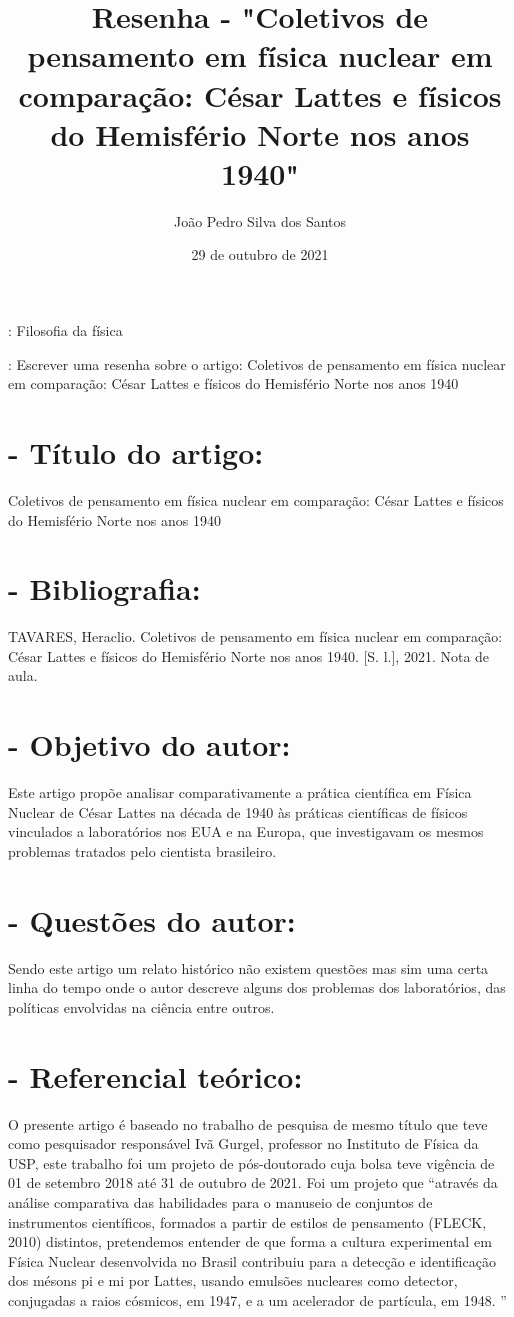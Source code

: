 \documentclass [a4paper, 12pt]{article}
\title{Resenha - "Coletivos de pensamento em física nuclear em comparação: César Lattes e físicos do Hemisfério Norte nos anos 1940"}
\author{João Pedro Silva dos Santos}
\date{29 de outubro de 2021}
\begin{document}
\maketitle

{}: Filosofia da física

{}: Escrever uma resenha sobre o artigo: Coletivos de pensamento em física nuclear em comparação: César Lattes e físicos do Hemisfério Norte nos anos 1940

\section*{- Título do artigo:}

Coletivos de pensamento em física nuclear em comparação: César Lattes e físicos do Hemisfério Norte nos anos 1940

\section*{-  Bibliografia:}

TAVARES, Heraclio. Coletivos de pensamento em física nuclear em comparação: César Lattes e físicos do Hemisfério Norte nos anos 1940. [S. l.], 2021. Nota de aula.

\section*{- Objetivo do autor:}

Este artigo propõe analisar comparativamente a prática científica em Física Nuclear de César Lattes na década de 1940 às práticas científicas de físicos vinculados a laboratórios nos EUA e na Europa, que investigavam os mesmos problemas tratados pelo cientista brasileiro.

\section*{- Questões do autor:}

Sendo este artigo um relato histórico não existem questões mas sim uma certa linha do tempo onde o autor descreve alguns dos problemas dos laboratórios, das políticas envolvidas na ciência entre outros.

\section*{- Referencial teórico:}

O presente artigo é baseado no trabalho de pesquisa de mesmo título que teve como pesquisador responsável Ivã Gurgel, professor no Instituto de Física da USP, este trabalho foi um projeto de pós-doutorado cuja bolsa teve vigência de 01 de setembro 2018 até 31 de outubro de 2021. Foi um projeto que “através da análise comparativa das habilidades para o manuseio de conjuntos de instrumentos científicos, formados a partir de estilos de pensamento (FLECK, 2010) distintos, pretendemos entender de que forma a cultura experimental em Física Nuclear desenvolvida no Brasil contribuiu para a detecção e identificação dos mésons pi e mi por Lattes, usando emulsões nucleares como detector, conjugadas a raios cósmicos, em 1947, e a um acelerador de partícula, em 1948. ”
\end{document}
